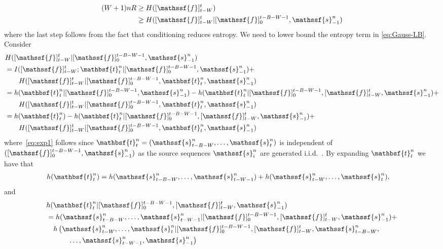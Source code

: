 \documentclass[journal, twocolumn, 10pt]{IEEEtran}
\newcommand{\rvf}{{\mathssf{f}}}    %
\newcommand{\rvs}{{\mathssf{s}}}    %
\newcommand{\rvbt}{{\mathbsf{t}}}
\begin{document}
{\begin{align}
(W+1)n R &\ge H([\rvf]_{t-W}^t)\notag\\
&\ge H([\rvf]_{t-W}^t| [\rvf]_{0}^{t-B-W-1}, \rvs_{-1}^n) \label{eq:Gauss-LB}
\end{align}
where the last step follows from the fact that conditioning reduces entropy. We need to lower bound the entropy term in \eqref{eq:Gauss-LB}. Consider
\begin{align}
&H([\rvf]_{t-W}^{t}|[\rvf]_{0}^{{t-B-W-1}}, \rvs_{-1}^n) \notag \\
&=I([\rvf]_{t-W}^{t};\rvbt_{t}^n|[\rvf]_{0}^{{t-B-W-1}}, \rvs_{-1}^n) + \notag\\ &\qquad H([\rvf]_{t-W}^{t}|[\rvf]_{0}^{{t-B-W-1}}, \rvbt_{t}^n, \rvs_{-1}^n)\\
&=h(\rvbt_{t}^n|[\rvf]_{0}^{{t-B-W-1}}, \rvs_{-1}^n) -h(\rvbt_{t}^n|[\rvf]_{0}^{{t-B-W-1}}, [\rvf]_{t-W}^{t}, \rvs_{-1}^n)  + \notag\\ &\qquad H([\rvf]_{t-W}^{t}|[\rvf]_{0}^{{t-B-W-1}}, \rvbt_{t}^n, \rvs_{-1}^n)\notag\\
&=h(\rvbt_{t}^n) -h(\rvbt_{t}^n|[\rvf]_{0}^{{t-B-W-1}}, [\rvf]_{t-W}^{t}, \rvs_{-1}^n) + \notag\\ &\qquad  H([\rvf]_{t-W}^{t}|[\rvf]_{0}^{{t-B-W-1}}, \rvbt_{t}^n, \rvs_{-1}^n) \label{eq:exp1}
\end{align}
where~\eqref{eq:exp1} follows since ${\rvbt_{t}^n = (\rvs_{t-B-W}^n,\ldots, \rvs_{t}^n)}$ is independent of $([\rvf]_0^{{t-B-W-1}}, \rvs_{-1}^n)$ as the source sequences $\rvs_i^n$ are generated i.i.d.\ . By expanding $\rvbt_{t}^n$ we have that
\begin{align}
h(\rvbt_{t}^n)  &= h(\rvs_{t-B-W}^n, \ldots, \rvs_{t-W-1}^n)  + h(\rvs_{t-W}^n, \ldots, \rvs_{t}^n), \label{eq:rel1}
\end{align}and
\begin{align}
&h(\rvbt_{t}^n|[\rvf]_{0}^{{t-B-W-1}}, [\rvf]_{t-W}^{t}, \rvs_{-1}^n) \notag\\&=h(\rvs_{t-B-W}^n, \ldots, \rvs_{t-W-1}^n|[\rvf]_{0}^{{t-B-W-1}}, [\rvf]_{t-W}^{t}, \rvs_{-1}^n) + \notag \\ &\quad h\left(\rvs_{t-W}^n, \ldots, \rvs_{t}^n|[\rvf]_{0}^{{t-B-W-1}}, [\rvf]_{t-W}^{t}  ,\rvs_{t-B-W}^n,\right.\notag\\
&\left.\quad\quad \quad  \ldots, \rvs_{t-W-1}^n, \rvs_{-1}^n\right) \label{eq:rel2}
\end{align}

}
\end{document}
